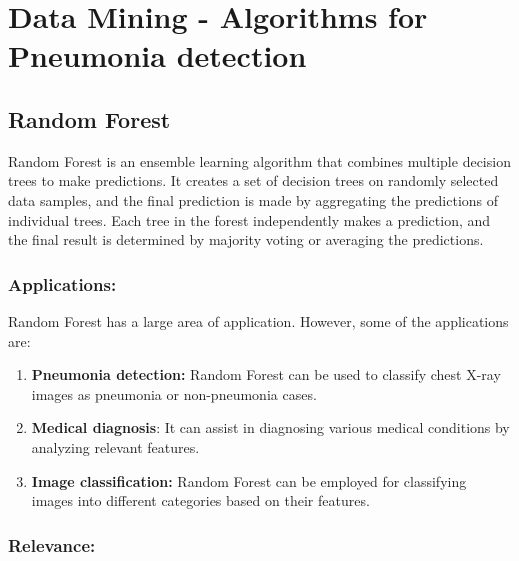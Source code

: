 %
%



\chapter{Data Mining - Algorithms for Pneumonia detection}


\section{Random Forest}

Random Forest is an ensemble learning algorithm that combines multiple decision trees to make predictions. It creates a set of decision trees on randomly selected data samples, and the final prediction is made by aggregating the predictions of individual trees. Each tree in the forest independently makes a prediction, and the final result is determined by majority voting or averaging the predictions. \autocite{Breiman:2001}

\subsection{Applications:}

Random Forest has a large area of application. However, some of the applications are:\\

\begin{enumerate}

\item \textbf{Pneumonia detection:} Random Forest can be used to classify chest X-ray images as pneumonia or non-pneumonia cases.
\item \textbf{Medical diagnosis}: It can assist in diagnosing various medical conditions by analyzing relevant features.
\item \textbf{Image classification:} Random Forest can be employed for classifying images into different categories based on their features.

\end{enumerate}

\subsection{Relevance:}

